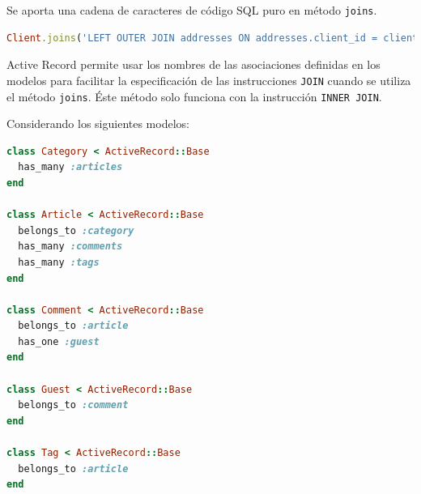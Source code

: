 Se aporta una cadena de caracteres de código SQL puro en método \texttt{joins}.

\begin{lstlisting}[language=Ruby]
Client.joins('LEFT OUTER JOIN addresses ON addresses.client_id = clients.id');
\end{lstlisting}

Active Record permite usar los nombres de las asociaciones definidas en los modelos para facilitar la especificación de las instrucciones \texttt{JOIN} cuando se utiliza el método \texttt{joins}. Éste método solo funciona con la instrucción \texttt{INNER JOIN}.

Considerando los siguientes modelos:

\begin{lstlisting}[language=Ruby]
class Category < ActiveRecord::Base
  has_many :articles
end
 
class Article < ActiveRecord::Base
  belongs_to :category
  has_many :comments
  has_many :tags
end
 
class Comment < ActiveRecord::Base
  belongs_to :article
  has_one :guest
end
 
class Guest < ActiveRecord::Base
  belongs_to :comment
end
 
class Tag < ActiveRecord::Base
  belongs_to :article
end
\end{lstlisting}

